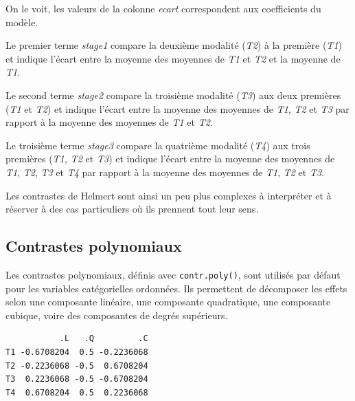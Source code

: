 \documentclass[
  letterpaper,
  DIV=11,
  numbers=noendperiod,
  oneside]{scrreprt}
\newenvironment{Shaded}{\begin{snugshade}}{\end{snugshade}}
\newcommand{\FunctionTok}[1]{\textcolor[rgb]{0.28,0.35,0.67}{#1}}
\newcommand{\NormalTok}[1]{\textcolor[rgb]{0.00,0.23,0.31}{#1}}
\newcommand{\OtherTok}[1]{\textcolor[rgb]{0.00,0.23,0.31}{#1}}
\newcommand{\SpecialCharTok}[1]{\textcolor[rgb]{0.37,0.37,0.37}{#1}}
\begin{document}
On le voit, les valeurs de la colonne \emph{ecart} correspondent aux
coefficients du modèle.

Le premier terme \emph{stage1} compare la deuxième modalité (\emph{T2})
à la première (\emph{T1}) et indique l'écart entre la moyenne des
moyennes de \emph{T1} et \emph{T2} et la moyenne de \emph{T1}.

Le second terme \emph{stage2} compare la troisième modalité (\emph{T3})
aux deux premières (\emph{T1} et \emph{T2}) et indique l'écart entre la
moyenne des moyennes de \emph{T1}, \emph{T2} et \emph{T3} par rapport à
la moyenne des moyennes de \emph{T1} et \emph{T2}.

Le troisième terme \emph{stage3} compare la quatrième modalité
(\emph{T4}) aux trois premières (\emph{T1,} \emph{T2} et \emph{T3}) et
indique l'écart entre la moyenne des moyennes de \emph{T1}, \emph{T2},
\emph{T3} et \emph{T4} par rapport à la moyenne des moyennes de
\emph{T1}, \emph{T2} et \emph{T3}.

Les contrastes de Helmert sont ainsi un peu plus complexes à interpréter
et à réserver à des cas particuliers où ils prennent tout leur sens.

\hypertarget{contrastes-polynomiaux}{%
\subsection{Contrastes polynomiaux}\label{contrastes-polynomiaux}}

Les contrastes polynomiaux, définis avec \texttt{contr.poly()}, sont
utilisés par défaut pour les variables catégorielles ordonnées. Ils
permettent de décomposer les effets selon une composante linéaire, une
composante quadratique, une composante cubique, voire des composantes de
degrés supérieurs.

\begin{Shaded}
\end{Shaded}

\begin{verbatim}
           .L   .Q         .C
T1 -0.6708204  0.5 -0.2236068
T2 -0.2236068 -0.5  0.6708204
T3  0.2236068 -0.5 -0.6708204
T4  0.6708204  0.5  0.2236068
\end{verbatim}
\end{document}
